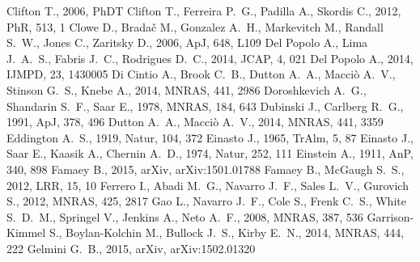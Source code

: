 \documentclass[a4wide,12pt]{book}
\begin{document}
\begin{thebibliography}{}
Clifton T., 2006, PhDT
 Clifton T., Ferreira P.~G., Padilla A., 
Skordis C., 2012, PhR, 513, 1  
Clowe D., Brada{\v c} M., Gonzalez A.~H., Markevitch M., Randall S.~W., 
Jones C., Zaritsky D., 2006, ApJ, 648, L109
 Del Popolo A., Lima J.~A.~S., Fabris 
J.~C., Rodrigues D.~C., 2014, JCAP, 4, 021 
Del Popolo A., 2014, IJMPD, 23, 1430005  
 Di Cintio A., Brook C.~B., Dutton A.~A., 
Macci{\`o} A.~V., Stinson G.~S., Knebe A., 2014, MNRAS, 441, 2986 
 Doroshkevich A.~G., Shandarin S.~F., Saar E., 1978, MNRAS, 184, 643 
 Dubinski J., Carlberg R.~G., 1991, ApJ, 378, 496 
 Dutton A.~A., Macci{\`o} A.~V., 2014, MNRAS, 441, 3359 
Eddington A.~S., 1919, Natur, 104, 372
Einasto J., 1965, TrAlm, 5, 87
 Einasto J., Saar E., Kaasik A., Chernin 
A.~D., 1974, Natur, 252, 111 
Einstein A., 1911, AnP, 340, 898 
 Famaey 
B., 2015, arXiv, arXiv:1501.01788 
 Famaey B., McGaugh S.~S., 2012, LRR, 15, 10 
 Ferrero I., Abadi M.~G., Navarro J.~F., 
Sales L.~V., Gurovich S., 2012, MNRAS, 425, 2817
Gao L., Navarro J.~F., Cole S., Frenk C.~S., White S.~D.~M., Springel V., 
Jenkins A., Neto A.~F., 2008, MNRAS, 387, 536
 Garrison-Kimmel S., Boylan-Kolchin M., 
Bullock J.~S., Kirby E.~N., 2014, MNRAS, 444, 222  
Gelmini G.~B., 2015, arXiv, arXiv:1502.01320

\end{thebibliography}
\end{document}
